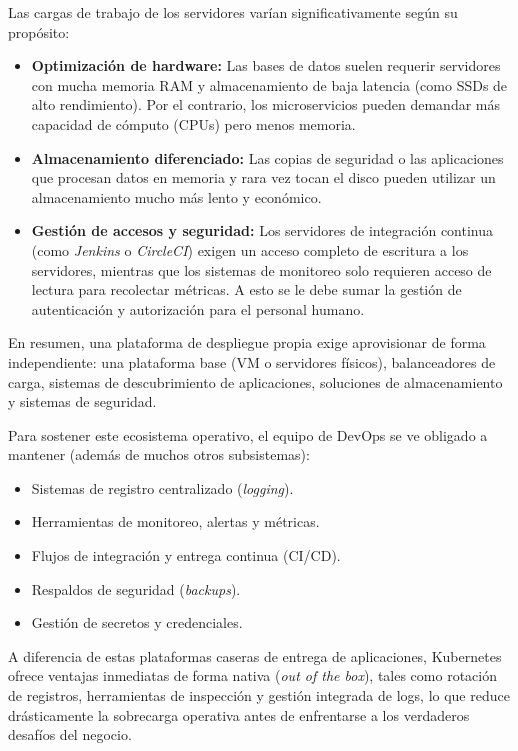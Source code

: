Las cargas de trabajo de los servidores varían significativamente según su propósito:
\begin{itemize}
    \item \textbf{Optimización de hardware:} Las bases de datos suelen requerir servidores con mucha memoria RAM y almacenamiento de baja latencia (como SSDs de alto rendimiento). Por el contrario, los microservicios pueden demandar más capacidad de cómputo (CPUs) pero menos memoria.
    \item \textbf{Almacenamiento diferenciado:} Las copias de seguridad o las aplicaciones que procesan datos en memoria y rara vez tocan el disco pueden utilizar un almacenamiento mucho más lento y económico.
    \item \textbf{Gestión de accesos y seguridad:} Los servidores de integración continua (como \textit{Jenkins} o \textit{CircleCI}) exigen un acceso completo de escritura a los servidores, mientras que los sistemas de monitoreo solo requieren acceso de lectura para recolectar métricas. A esto se le debe sumar la gestión de autenticación y autorización para el personal humano.
\end{itemize}

En resumen, una plataforma de despliegue propia exige aprovisionar de forma independiente: una plataforma base (VM o servidores físicos), balanceadores de carga, sistemas de descubrimiento de aplicaciones, soluciones de almacenamiento y sistemas de seguridad. 

Para sostener este ecosistema operativo, el equipo de DevOps se ve obligado a mantener (además de muchos otros subsistemas):
\begin{itemize}
    \item Sistemas de registro centralizado (\textit{logging}).
    \item Herramientas de monitoreo, alertas y métricas.
    \item Flujos de integración y entrega continua (CI/CD).
    \item Respaldos de seguridad (\textit{backups}).
    \item Gestión de secretos y credenciales.
\end{itemize}

A diferencia de estas plataformas caseras de entrega de aplicaciones, Kubernetes ofrece ventajas inmediatas de forma nativa (\textit{out of the box}), tales como rotación de registros, herramientas de inspección y gestión integrada de logs, lo que reduce drásticamente la sobrecarga operativa antes de enfrentarse a los verdaderos desafíos del negocio.

